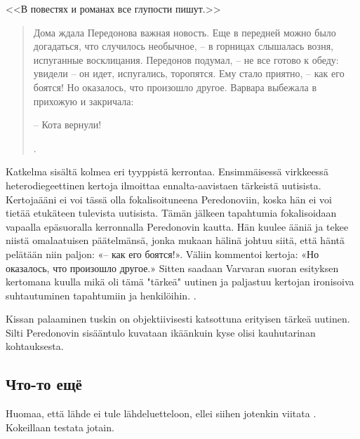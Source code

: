 \documentclass[12pt,a4paper]{article}
\begin{document}
<<В повестях и романах все глупости пишут.>>\parencite[54]{sologub2004}



\begin{quote}
Дома ждала Передонова важная новость. Еще в передней можно
было догадаться, что случилось необычное, – в горницах слышалась 
возня, испуганные восклицания. Передонов подумал, – не все
готово к обеду: увидели – он идет, испугались, торопятся. Ему стало
приятно, – как его боятся! Но оказалось, что произошло другое. 
Варвара выбежала в прихожую и закричала:

– Кота вернули!

\parencite[171]{sologub2004}.

\end{quote}

Katkelma sisältä kolmea eri tyyppistä kerrontaa. Ensimmäisessä virkkeessä
heterodiegeettinen kertoja ilmoittaa ennalta-aavistaen tärkeistä uutisista.
Kertojaääni ei voi tässä olla fokalisoituneena Peredonoviin, koska
hän ei voi tietää etukäteen tulevista uutisista. Tämän jälkeen tapahtumia
fokalisoidaan vapaalla epäsuoralla kerronnalla Peredonovin kautta. Hän
kuulee ääniä ja tekee niistä omalaatuisen päätelmänsä, jonka mukaan hälinä
johtuu siitä, että häntä pelätään niin paljon: «– как его боятся!». Väliin 
kommentoi kertoja: «Но оказалось, что произошло другое.» Sitten saadaan
Varvaran suoran esityksen kertomana kuulla mikä oli tämä "tärkeä" uutinen ja
paljastuu kertojan ironisoiva suhtautuminen tapahtumiin ja henkilöihin. \parencite[vrt.][230]{hutchings1997}.

Kissan palaaminen tuskin on objektiivisesti katsottuna erityisen tärkeä uutinen.
Silti Peredonovin sisääntulo kuvataan ikäänkuin kyse olisi kauhutarinan 
kohtauksesta.

\subsection{Что-то ещё}

Huomaa, että lähde ei tule lähdeluetteloon, ellei siihen jotenkin
viitata \parencite[55]{artjunova1983}. Kokeillaan testata jotain.


\printbibliography[heading=bibintoc,title={Список использоваемой литературы}]
\end{document}
